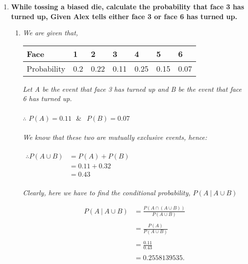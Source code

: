 \documentclass{article}
\begin{document}
\begin{enumerate}
\item \textbf{While tossing a biased die, calculate the probability that
face 3 has turned up, Given Alex tells either face 3 or face 6 has turned up.}

\begin{enumerate}
  \item\textit{We are given that,}
        \begin{center}
        \begin{tabular}{ | m{5em} | m{1cm}| m{1cm} | m{1cm} | m{1cm} | m{1cm} | m{1cm} | }
        \hline
        Face & 1 & 2 & 3 & 4 & 5 & 6\\
        \hline
        Probability & 0.2 & 0.22 & 0.11 & 0.25 & 0.15 & 0.07\\
        \hline
        \end{tabular}
        \end{center}

        \textit{Let A be the event that face 3 has turned up and B be the event that face 6 has turned up.}\\\\
        $\therefore $ $P(A) = 0.11\ \ \ \&\ \ $ $P(B) = 0.07$\\\\
        \textit{We know that these two are mutually exclusive events, hence:}\\\\
        $\begin{aligned}
        \therefore P(A \cup B) & = P(A) + P(B)\\
        & = 0.11 + 0.32 \\
        & = 0.43
        \end{aligned}$\\\\
        \textit{Clearly, here we have to find the conditional probability, $P(A \ |\ A \cup B)$}

        \begin{align*}
        P(A \ |\ A \cup B) & = \frac{P(A \cap (A \cup B))}{P(A \cup B)}\\\\
        & = \frac{P(A)}{P(A \cup B)}\\\\
        & = \frac{0.11}{0.43}\\\\
        & = 0.2558139535.
        \end{align*}


\end{enumerate}
\end{enumerate}
\end{document}
